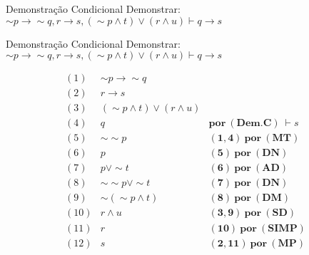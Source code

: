 \begin{frame}[t]{Demonstração Condicional}
	Demonstrar: $\sim p \rightarrow\sim q, r \rightarrow s, (\sim p \wedge t) \vee (r \wedge u) \vdash q \rightarrow s$
\end{frame}


\begin{frame}[t]{Demonstração Condicional}
	Demonstrar: $\sim p \rightarrow\sim q, r \rightarrow s, (\sim p \wedge t) \vee (r \wedge u) \vdash q \rightarrow s$
	
	\vskip 0.5cm
	
	$$\begin{array}{lll}
	(1) & \sim p \rightarrow\sim q & \\
	(2) & r \rightarrow s & \\
	(3) & (\sim p \wedge t) \vee (r \wedge u) & \\
	(4) & q & \mathbf{por~(Dem.C)~} \vdash s \\
	\hline
	(5) & \sim\sim p & \mathbf{(1,4)~por~(MT)} \\
	(6) & p & \mathbf{(5)~por~(DN)} \\
	(7) & p \vee \sim t & \mathbf{(6)~por~(AD)} \\
	(8) & \sim\sim p \vee\sim t & \mathbf{(7)~por~(DN)} \\
	(9) & \sim (\sim p \wedge t) & \mathbf{(8)~por~(DM)} \\
	(10) & r \wedge u & \mathbf{(3,9)~por~(SD)} \\
	(11) & r & \mathbf{(10)~por~(SIMP)}  \\
	(12) & s & \mathbf{(2,11)~por~(MP)}
	\end{array}$$	
\end{frame}
